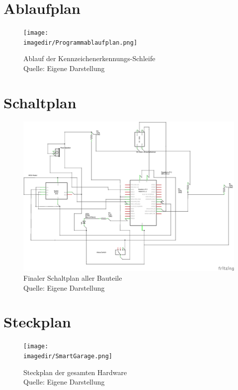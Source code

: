 \chapter{Ablaufplan}
\begin{figure}[H]
	\centering 
	\texttt{[image: \\imagedir/Programmablaufplan.png]}
	\captionsetup{format=hang}
	\caption[Programmablauf]{\label{Ablaufplan}Ablauf der Kennzeichenerkennungs-Schleife \\Quelle: Eigene Darstellung}
\end{figure}
\chapter{Schaltplan}
\begin{figure}[H]
	\centering
	\includegraphics[width=1\linewidth]{img/SmartGarage_Schaltplan}
	\caption[Schaltplan]{Finaler Schaltplan aller Bauteile \\ Quelle: Eigene Darstellung}
	\label{Schaltplan}
\end{figure}
\chapter{Steckplan}
\begin{figure}[H]
	\centering 
	\label{Steckplan}
	\texttt{[image: \\imagedir/SmartGarage.png]}
	\captionsetup{format=hang}
	\caption[Steckplan groß]{Steckplan der gesamten Hardware \\Quelle: Eigene Darstellung}
\end{figure}

